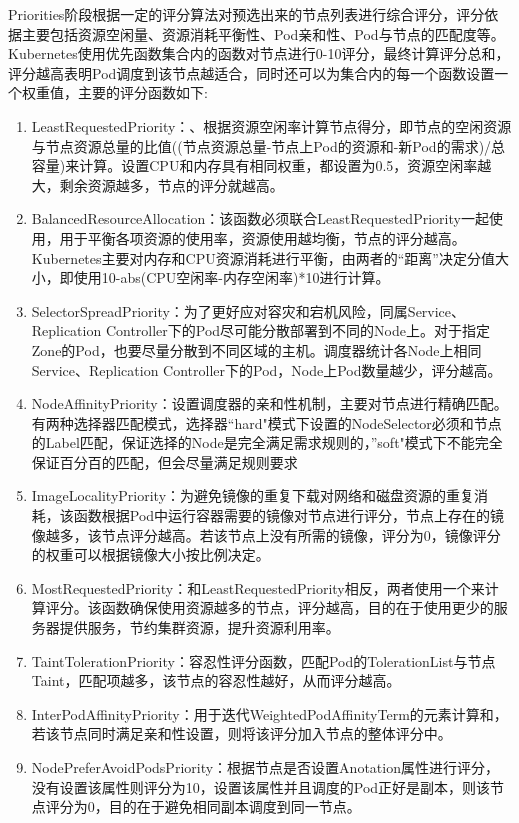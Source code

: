 Priorities阶段根据一定的评分算法对预选出来的节点列表进行综合评分，评分依据主要包括资源空闲量、资源消耗平衡性、Pod亲和性、Pod与节点的匹配度等。Kubernetes使用优先函数集合内的函数对节点进行0-10评分，最终计算评分总和，评分越高表明Pod调度到该节点越适合，同时还可以为集合内的每一个函数设置一个权重值，主要的评分函数如下:
\begin{enumerate}[(1)]
	\item LeastRequestedPriority：、根据资源空闲率计算节点得分，即节点的空闲资源与节点资源总量的比值((节点资源总量-节点上Pod的资源和-新Pod的需求)/总容量)来计算。设置CPU和内存具有相同权重，都设置为0.5，资源空闲率越大，剩余资源越多，节点的评分就越高。
	\item BalancedResourceAllocation：该函数必须联合LeastRequestedPriority一起使用，用于平衡各项资源的使用率，资源使用越均衡，节点的评分越高。Kubernetes主要对内存和CPU资源消耗进行平衡，由两者的“距离”决定分值大小，即使用10-abs(CPU空闲率-内存空闲率)*10进行计算。
	\item SelectorSpreadPriority：为了更好应对容灾和宕机风险，同属Service、Replication Controller下的Pod尽可能分散部署到不同的Node上。对于指定Zone的Pod，也要尽量分散到不同区域的主机。调度器统计各Node上相同Service、Replication Controller下的Pod，Node上Pod数量越少，评分越高。
	\item NodeAffinityPriority：设置调度器的亲和性机制，主要对节点进行精确匹配。有两种选择器匹配模式，选择器“hard"模式下设置的NodeSelector必须和节点的Label匹配，保证选择的Node是完全满足需求规则的，”soft"模式下不能完全保证百分百的匹配，但会尽量满足规则要求
	\item ImageLocalityPriority：为避免镜像的重复下载对网络和磁盘资源的重复消耗，该函数根据Pod中运行容器需要的镜像对节点进行评分，节点上存在的镜像越多，该节点评分越高。若该节点上没有所需的镜像，评分为0，镜像评分的权重可以根据镜像大小按比例决定。
	\item MostRequestedPriority：和LeastRequestedPriority相反，两者使用一个来计算评分。该函数确保使用资源越多的节点，评分越高，目的在于使用更少的服务器提供服务，节约集群资源，提升资源利用率。
	\item TaintTolerationPriority：容忍性评分函数，匹配Pod的TolerationList与节点Taint，匹配项越多，该节点的容忍性越好，从而评分越高。
	\item InterPodAffinityPriority：用于迭代WeightedPodAffinityTerm的元素计算和，若该节点同时满足亲和性设置，则将该评分加入节点的整体评分中。
	\item NodePreferAvoidPodsPriority：根据节点是否设置Anotation属性进行评分，没有设置该属性则评分为10，设置该属性并且调度的Pod正好是副本，则该节点评分为0，目的在于避免相同副本调度到同一节点。
\end{enumerate}

